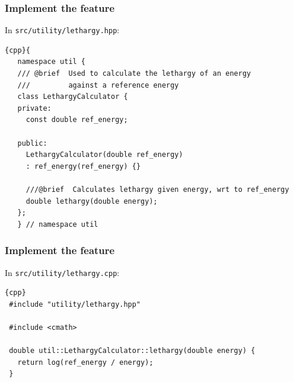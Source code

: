 \documentclass{beamer}
\begin{document}
\begin{frame}[fragile]
\frametitle{Implement the feature}
In \verb|src/utility/lethargy.hpp|:
\scriptsize{
\begin{lstlisting}{cpp}{
   namespace util {
   /// @brief  Used to calculate the lethargy of an energy
   ///         against a reference energy
   class LethargyCalculator {
   private:
     const double ref_energy;
     
   public:
     LethargyCalculator(double ref_energy) 
     : ref_energy(ref_energy) {}
    
     ///@brief  Calculates lethargy given energy, wrt to ref_energy
     double lethargy(double energy);
   };
   } // namespace util
\end{lstlisting}
}
\end{frame}

\begin{frame}[fragile]
\frametitle{Implement the feature}
In \verb|src/utility/lethargy.cpp|:

\scriptsize{
\begin{lstlisting}{cpp}
 #include "utility/lethargy.hpp"

 #include <cmath>

 double util::LethargyCalculator::lethargy(double energy) {
   return log(ref_energy / energy);
 }

\end{lstlisting}
}
\end{frame}
\end{document}
